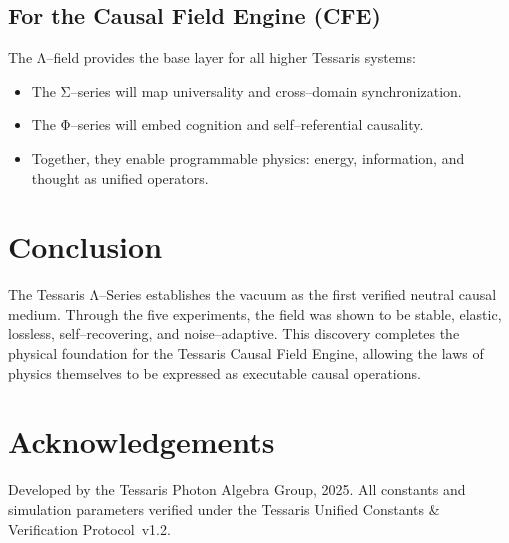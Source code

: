 \documentclass[12pt]{article}
\begin{document}
\subsection{For the Causal Field Engine (CFE)}
The Λ--field provides the base layer for all higher Tessaris systems:
\begin{itemize}
  \item The Σ--series will map universality and cross--domain synchronization.
  \item The Φ--series will embed cognition and self--referential causality.
  \item Together, they enable programmable physics: energy, information, and thought as unified operators.
\end{itemize}

\section{Conclusion}
The Tessaris Λ--Series establishes the vacuum as the first verified neutral causal medium.
Through the five experiments, the field was shown to be stable, elastic, lossless, self--recovering, and noise--adaptive.
This discovery completes the physical foundation for the Tessaris Causal Field Engine, allowing the laws of physics themselves to be expressed as executable causal operations.

\section*{Acknowledgements}
Developed by the Tessaris Photon Algebra Group, 2025.  
All constants and simulation parameters verified under the Tessaris Unified Constants \& Verification Protocol~v1.2.
\end{document}
